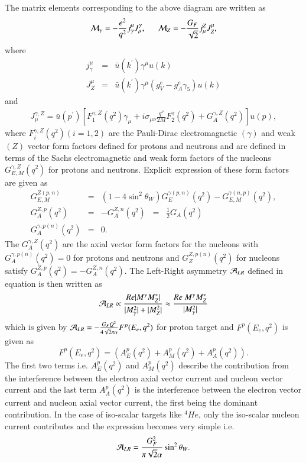 The matrix elements corresponding to the above diagram are  written as 
\begin{eqnarray}
{\cal M}_\gamma= -\frac{e^2}{q^2}j^\mu_\gamma J_\mu^\gamma, ~~~~~~ {\cal M}_{Z}= -\frac{G_F}{\sqrt{2}}j_\mu^Z J^\mu_Z,
\end{eqnarray}
where
\begin{eqnarray}
j^\mu_\gamma&=& \bar{u}(k^\prime)\gamma^\mu u(k)\\
J^\mu_Z &=& \bar{u}(k^\prime)\gamma^\mu (g_V^e-g_A^e\gamma_5)u(k)
\end{eqnarray}
and 
\begin{eqnarray}\label{eq:curr}
J^{\gamma,Z}_\mu = \bar{u}(p^\prime)[F_1^{\gamma,Z}(q^2)\gamma_\mu+i\sigma_{\mu\nu}\frac{q^\nu}{2M}F_2^\gamma(q^2)+G_A^{\gamma,Z}(q^2)]u(p),
\end{eqnarray}
where $F_i^{\gamma,Z}(q^2)(i=1,2)$
are the Pauli-Dirac electromagnetic $(\gamma)$ and weak $(Z)$ vector form factors defined for protons and neutrons and are defined in terms of the Sachs electromagnetic and weak form factors of the nucleons $G^{\gamma,Z}_{E,M}(q^2)$ for protons and neutrons. Explicit expression of these form factors are given as
\begin{eqnarray}
 G_{E,M}^{Z(p,n)}&=&(1-4\sin^2 \theta_W)G_{E}^{\gamma(p,n)}(q^2)-G_{E,M}^{\gamma(n,p)} (q^2), \\
 G_A^{Z,p}(q^2)&=&-G_A^{Z,n}(q^2) \;\; = \;\; \frac{1}{2}G_A(q^2) \\ 
 G_A^{\gamma,p(n)}(q^2)&=& 0 . 
\end{eqnarray}
The $G^{\gamma,Z}_A(q^2)$ are the axial vector form factors for the nucleons with $G^{\gamma,p(n)}_A(q^2)=0$ for protons and neutrons and $G^{Z,p(n)}_Z(q^2)$ for nucleons satisfy $G^{Z,p}_A(q^2)=-G^{Z,n}_A(q^2)$. The Left-Right asymmetry ${\cal A}_{LR}$ defined in equation is then written as 
\begin{equation}
 {\cal A}_{LR}\propto \frac{Re|M^\gamma M_Z^*|}{|M_\gamma^2|+|M_Z^2|} \approx \frac{Re~ M^\gamma M_Z^*}{|M_\gamma^2|}
\end{equation}
 which is given by ${\cal A}_{LR}=-\frac{G_F Q^2}{4\sqrt{2}\pi\alpha}F^p(E_e,q^2)$ for proton target and $F^p(E_e,q^2)$ is given as
 \begin{equation}
F^p(E_e,q^2)= (A^{p}_E(q^2) +A_M^{p}(q^2)+A_A^p(q^2)).
 \end{equation}
The first two terms i.e. $A^{p}_E(q^2)$ and $A_M^{p}(q^2)$ describe the contribution from the interference between the electron axial vector current and nucleon vector current and the last term $A_A^p(q^2)$ is the interference between the electron vector current and nucleon axial vector current, the first being the dominant contribution. In the case of  iso-scalar targets like $^4{He}$, only the iso-scalar nucleon current contributes and the expression becomes very simple i.e. 
\begin{equation}
 {\cal A}_{LR} = \frac{G_F^2}{\pi\sqrt{2}\alpha}\sin^2\theta_W.
\end{equation}

